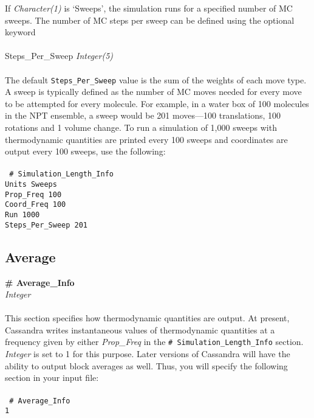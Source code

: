 %
If {\it Character(1)} is `Sweeps', the simulation runs for a specified number of MC sweeps. 
The number of MC steps per sweep can be defined using the optional keyword \\ \\
%
Steps\_Per\_Sweep {\it Integer(5)} \\ \\
%
The default \texttt{Steps\_Per\_Sweep} value is the sum of the weights of each move type. 
A sweep is typically defined as the number of MC moves needed for every move to be attempted for every molecule.
For example, in a water box of 100 molecules in the NPT ensemble, a sweep would be 201 moves---100 translations,
100 rotations and 1 volume change.
To run a simulation of 1,000 sweeps with thermodynamic quantities are printed every 100 sweeps
and coordinates are output every 100 sweeps, use the following: \\ \\
%
\texttt{
\# Simulation\_Length\_Info \\
Units             Sweeps \\
Prop\_Freq        100 \\
Coord\_Freq       100 \\
Run               1000 \\
Steps\_Per\_Sweep 201 \\}

%
%
%
%
\subsection{Average}\label{sec:Average_Info}
{\bf \# Average\_Info} \\
{\it Integer} \\ \\
%
This section specifies how thermodynamic quantities are output. At present, Cassandra
writes instantaneous values of thermodynamic quantities at a frequency given by
either {\it Prop\_Freq} in the \texttt{\# Simulation\_Length\_Info} section. {\it Integer}
is set to 1 for this purpose. Later versions of Cassandra will have the ability to output block
averages as well. Thus, you will specify the following section in your input file: \\ \\
%
\texttt{
\# Average\_Info \\ 
1}
%
%
